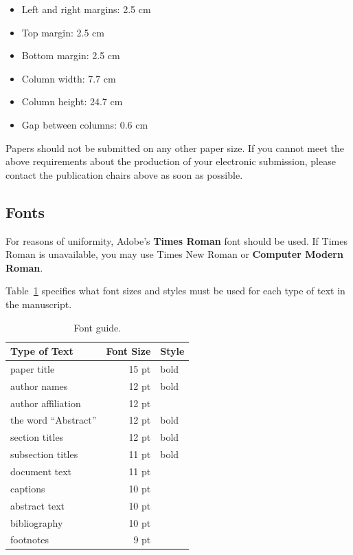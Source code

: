 \documentclass[11pt,a4paper]{article}
\begin{document}
\begin{itemize}
\item Left and right margins: 2.5 cm
\item Top margin: 2.5 cm
\item Bottom margin: 2.5 cm
\item Column width: 7.7 cm
\item Column height: 24.7 cm
\item Gap between columns: 0.6 cm
\end{itemize}

\noindent Papers should not be submitted on any other paper size.
If you cannot meet the above requirements about the production of your electronic submission, please contact the publication chairs above as soon as possible.

\subsection{Fonts}

For reasons of uniformity, Adobe's \textbf{Times Roman} font should be used.
If Times Roman is unavailable, you may use Times New Roman or \textbf{Computer Modern Roman}.

Table~\ref{font-table} specifies what font sizes and styles must be used for each type of text in the manuscript.

\begin{table}
\centering
\begin{tabular}{lrl}
\hline \textbf{Type of Text} & \textbf{Font Size} & \textbf{Style} \\ \hline
paper title & 15 pt & bold \\
author names & 12 pt & bold \\
author affiliation & 12 pt & \\
the word ``Abstract'' & 12 pt & bold \\
section titles & 12 pt & bold \\
subsection titles & 11 pt & bold \\
document text & 11 pt  &\\
captions & 10 pt & \\
abstract text & 10 pt & \\
bibliography & 10 pt & \\
footnotes & 9 pt & \\
\hline
\end{tabular}
\caption{\label{font-table} Font guide. }
\end{table}
\end{document}
